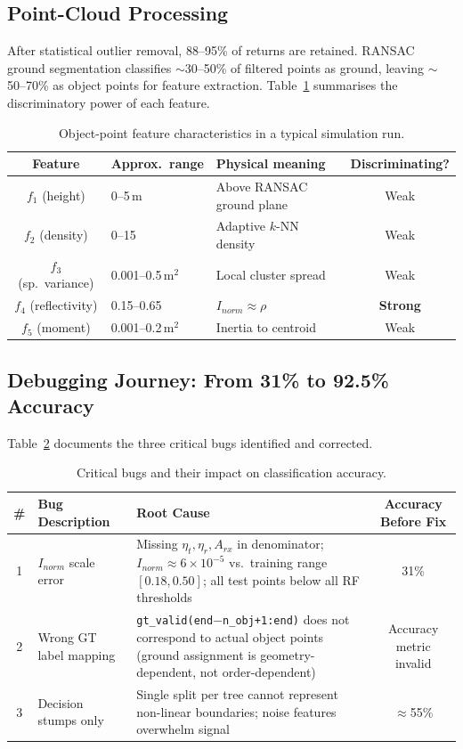 \documentclass[12pt,a4paper]{article}
\begin{document}
\subsection{Point-Cloud Processing}

After statistical outlier removal, 88--95\% of returns are retained.  RANSAC ground
segmentation classifies $\sim$30--50\% of filtered points as ground, leaving
$\sim$50--70\% as object points for feature extraction.
Table~\ref{tab:features_dist} summarises the discriminatory power of each feature.

\begin{table}[H]
\centering
\caption{Object-point feature characteristics in a typical simulation run.}
\label{tab:features_dist}
\begin{tabular}{cllc}
\toprule
\textbf{Feature} & \textbf{Approx.\ range} & \textbf{Physical meaning} & \textbf{Discriminating?} \\
\midrule
$f_1$ (height)       & 0--5\,m      & Above RANSAC ground plane & Weak \\
$f_2$ (density)      & 0--15        & Adaptive $k$-NN density   & Weak \\
$f_3$ (sp.\ variance)& 0.001--0.5\,m$^2$ & Local cluster spread & Weak \\
$f_4$ (reflectivity) & 0.15--0.65   & $I_{norm}\approx\rho$     & \textbf{Strong} \\
$f_5$ (moment)       & 0.001--0.2\,m$^2$ & Inertia to centroid   & Weak \\
\bottomrule
\end{tabular}
\end{table}

\subsection{Debugging Journey: From 31\% to 92.5\% Accuracy}

Table~\ref{tab:bugs} documents the three critical bugs identified and corrected.

\begin{table}[H]
\centering
\caption{Critical bugs and their impact on classification accuracy.}
\label{tab:bugs}
\small
\begin{tabularx}{\linewidth}{cXXc}
\toprule
\textbf{\#} & \textbf{Bug Description} & \textbf{Root Cause} & \textbf{Accuracy Before Fix} \\
\midrule
1 & $I_{norm}$ scale error & Missing $\eta_t, \eta_r, A_{rx}$ in denominator; $I_{norm} \approx 6\times10^{-5}$ vs.\ training range $[0.18,0.50]$; all test points below all RF thresholds & 31\% \\[4pt]
2 & Wrong GT label mapping & \texttt{gt\_valid(end$-$n\_obj+1:end)} does not correspond to actual object points (ground assignment is geometry-dependent, not order-dependent) & Accuracy metric invalid \\[4pt]
3 & Decision stumps only & Single split per tree cannot represent non-linear boundaries; noise features overwhelm signal & $\approx$55\% \\
\bottomrule
\end{tabularx}
\end{table}
\end{document}
